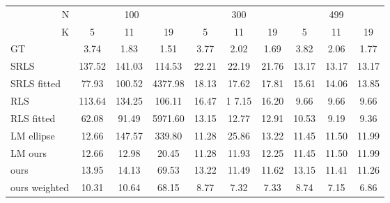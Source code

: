 \begin{tabular}{l|ccc|ccc|ccc|}
\toprule
\multicolumn{1}{r|}{N} & \multicolumn{3}{c}{100} & \multicolumn{3}{c}{300} & \multicolumn{3}{c}{499} \\
\multicolumn{1}{r|}{K} &      5  &      11 &       19 &     5  &     11 &     19 &     5  &     11 &     19 \\
\midrule
GT            &    3.74 &    1.83 &     1.51 &   3.77 &   2.02 &   1.69 &   3.82 &   2.06 &   1.77 \\
\midrule SRLS         &  137.52 &  141.03 &   114.53 &  22.21 &  22.19 &  21.76 &  13.17 &  13.17 &  13.17 \\
SRLS fitted   &   77.93 &  100.52 &  4377.98 &  18.13 &  17.62 &  17.81 &  15.61 &  14.06 &  13.85 \\
RLS           &  113.64 &  134.25 &   106.11 &  16.47 &  1\cellcolor{\firstcolor} 7.15 &  16.20 &   \cellcolor{\secondcolor} 9.66 &   \cellcolor{\secondcolor} 9.66 &   \cellcolor{\secondcolor} 9.66 \\
RLS fitted    &   62.08 &   91.49 &  5971.60 &  13.15 &  12.77 &  12.91 &  10.53 &   \cellcolor{\secondcolor} 9.19 &   \cellcolor{\secondcolor} 9.36 \\
LM ellipse    &   \cellcolor{\secondcolor} 12.66 &  147.57 &   339.80 &  \cellcolor{\secondcolor} 11.28 &  25.86 &  13.22 &  11.45 &  11.50 &  11.99 \\
LM ours       &   \cellcolor{\secondcolor} 12.66 &   \cellcolor{\secondcolor} 12.98 &    \cellcolor{\firstcolor} 20.45 &  \cellcolor{\secondcolor} 11.28 &  11.93 &  12.25 &  11.45 &  11.50 &  11.99 \\
ours          &   13.95 &   14.13 &    69.53 &  13.22 &  \cellcolor{\secondcolor} 11.49 &  \cellcolor{\secondcolor} 11.62 &  13.15 &  11.41 &  11.26 \\
ours weighted &   \cellcolor{\firstcolor} 10.31 &   \cellcolor{\firstcolor} 10.64 &    \cellcolor{\secondcolor} 68.15 &   \cellcolor{\firstcolor} 8.77 &   \cellcolor{\firstcolor} 7.32 &   \cellcolor{\firstcolor} 7.33 &   \cellcolor{\firstcolor} 8.74 &   \cellcolor{\firstcolor} 7.15 &   \cellcolor{\firstcolor} 6.86 \\
\bottomrule
\end{tabular}
